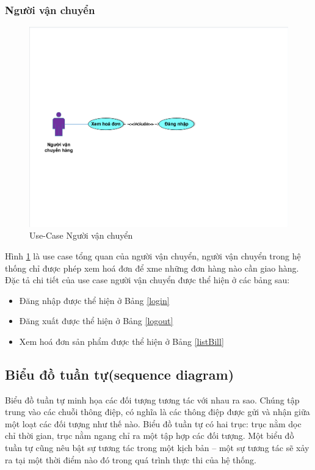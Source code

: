 \subsubsection{Người vận chuyển}
\begin{center}
    \begin{figure}[h]
    \begin{center}
     \includegraphics[scale=0.7]{image/UseCaseTongQuanNVC.pdf}
    \end{center}
    \caption{Use-Case Người vận chuyển}
    \label{refhinh3_5}
    \end{figure}
\end{center}
Hình \ref{refhinh3_5} là use case tổng quan của người vận chuyển, người vận chuyển trong hệ thống chỉ được phép xem hoá đơn để xme những đơn hàng nào cần giao hàng. Đặc tả chi tiết của use case người vận chuyển được thể hiện ở các bảng sau:
\begin{itemize}
\item Đăng nhập được thể hiện ở Bảng \ref{login}
\item Đăng xuất được thể hiện ở Bảng \ref{logout}
\item Xem hoá đơn sản phẩm được thể hiện ở Bảng \ref{listBill}
\end{itemize}
\subsection{Biểu đồ tuần tự(sequence diagram)}
Biểu đồ tuần tự minh họa các đối tượng tương tác với nhau ra sao. Chúng tập trung vào các chuỗi thông điệp, có nghĩa là các thông điệp được gửi và nhận giữa một loạt các đối tượng như thế nào. Biểu đồ tuần tự có hai trục: trục nằm dọc chỉ thời gian, trục nằm ngang chỉ ra một tập hợp các đối tượng. Một biểu đồ tuần tự cũng nêu bật sự tương tác trong một kịch bản – một sự tương tác sẽ xảy ra tại một thời điểm nào đó trong quá trình thực thi của hệ thống.


